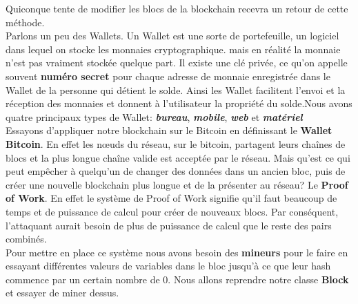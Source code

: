 \documentclass[12pt]{report}
\begin{document}
Quiconque tente de modifier les blocs de la blockchain recevra un retour de cette méthode.\\

\hspace{1cm}Parlons un peu des Wallets. Un Wallet est une sorte de portefeuille, un logiciel dans lequel on stocke les monnaies cryptographique. mais en réalité la monnaie n'est pas vraiment stockée quelque part. Il existe une clé privée, ce qu'on appelle souvent \textbf{numéro secret} pour chaque adresse de monnaie enregistrée dans le Wallet de la personne qui détient le solde. Ainsi les Wallet facilitent l'envoi et la réception des monnaies et donnent à l'utilisateur la propriété du solde.Nous avons quatre principaux types de Wallet: \textbf{\textit{bureau}}, \textbf{\textit{mobile}}, \textbf{\textit{web}} et \textbf{\textit{matériel}}\\

\hspace{1cm} Essayons d'appliquer notre blockchain sur le Bitcoin en définissant le \textbf{Wallet Bitcoin}. En effet les nœuds du réseau, sur le bitcoin, partagent leurs chaînes de blocs et la plus longue chaîne valide est acceptée par le réseau. Mais qu'est ce qui peut empêcher à quelqu'un de changer des données dans un ancien bloc, puis de créer une nouvelle blockchain plus longue et de la présenter au réseau? Le \textbf{Proof of Work}. En effet le système de Proof of Work signifie qu'il faut beaucoup de temps et de puissance de calcul pour créer de nouveaux blocs. Par conséquent, l'attaquant aurait besoin de plus de puissance de calcul que le reste des pairs combinés.\\

\hspace{1cm} Pour mettre en place ce système nous avons besoin des \textbf{mineurs} pour le faire en essayant différentes valeurs de variables dans le bloc jusqu'à ce que leur hash commence par un certain nombre de 0. Nous allons reprendre notre classe \textbf{Block} et essayer de miner dessus.
\end{document}
